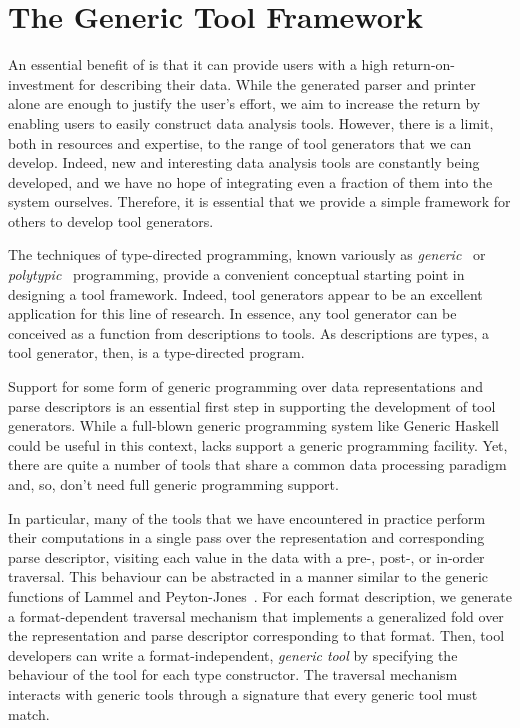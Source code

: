 \section{The Generic Tool Framework}
\label{sec:gen-tool}

An essential benefit of \padsml{} is that it can provide users with a
high return-on-investment for describing their data. While the
generated parser and printer alone are enough to justify the user's
effort, we aim to increase the return by enabling users to easily
construct data analysis tools. However, there is a limit, both in
resources and expertise, to the range of tool generators that we can
develop.  Indeed, new and interesting data analysis tools are
constantly being developed, and we have no hope of integrating even a
fraction of them into the \padsml{} system ourselves. Therefore, it is
essential that we provide a simple framework for others to develop
tool generators.

The techniques of type-directed programming, known variously as
\textit{generic}~\cite{hinze+:generic-programming} or
\textit{polytypic}~\cite{jeuring+:polytypic-programming} programming,
provide a convenient conceptual starting point in designing a tool
framework.  Indeed, tool generators appear to be an excellent
application for this line of research. In essence, any tool generator
can be conceived as a function from descriptions to tools. As
\padsml{} descriptions are types, a tool generator, then, is a
type-directed program.

Support for some form of generic programming over data representations
and parse descriptors is an essential first step in supporting the
development of tool generators. While a full-blown generic programming
system like Generic Haskell~\cite{hinze+:generic-haskell} could be useful in this context, \ocaml{}
lacks support a generic programming facility. Yet, there are quite a
number of tools that share a common data processing paradigm and, so,
don't need full generic programming support.

In particular, many of the tools that we have encountered in practice
perform their computations in a single pass over the representation
and corresponding parse descriptor, visiting each value in the data
with a pre-, post-, or in-order traversal. This behaviour can be
abstracted in a manner similar to the generic functions of Lammel and
Peyton-Jones~\cite{???}. For each format description, we generate a
format-dependent traversal mechanism that implements a generalized
fold over the representation and parse descriptor corresponding to
that format. Then, tool developers can write a format-independent,
\emph{generic tool} by specifying the behaviour of the tool for each
\padsml{} type constructor. The traversal mechanism interacts with
generic tools through a signature that every generic tool must match.

